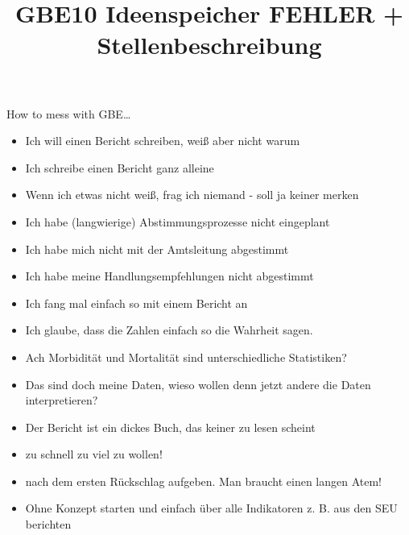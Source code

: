 \documentclass{article}
\begin{document}
\title{GBE10 Ideenspeicher FEHLER + Stellenbeschreibung}

\maketitle


How to mess with GBE…




\begin{itemize}
\item Ich will einen Bericht schreiben, weiß aber nicht warum


\item Ich schreibe einen Bericht ganz alleine


\item Wenn ich etwas nicht weiß, frag ich niemand - soll ja keiner merken


\item Ich habe (langwierige) Abstimmungsprozesse nicht eingeplant


\item Ich habe mich nicht mit der Amtsleitung abgestimmt


\item Ich habe meine Handlungsempfehlungen nicht abgestimmt


\item Ich fang mal einfach so mit einem Bericht an


\item Ich glaube, dass die Zahlen einfach so die Wahrheit sagen.


\item Ach Morbidität und Mortalität sind unterschiedliche Statistiken?


\item Das sind doch meine Daten, wieso wollen denn jetzt andere die Daten interpretieren?


\item Der Bericht ist ein dickes Buch, das keiner zu lesen scheint


\item zu schnell zu viel zu wollen!


\item nach dem ersten Rückschlag aufgeben. Man braucht einen langen Atem!


\item Ohne Konzept starten und einfach über alle Indikatoren z. B. aus den SEU berichten


\end{itemize}
\end{document}

